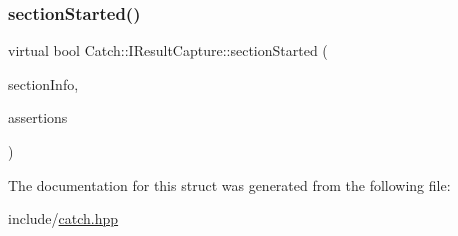 \mbox{\label{structCatch_1_1IResultCapture_a5b76ed52badcb64cf374202e12b81a03}} 
\subsubsection{\texorpdfstring{section\+Started()}{sectionStarted()}}
{\footnotesize\ttfamily virtual bool Catch\+::\+I\+Result\+Capture\+::section\+Started (\begin{DoxyParamCaption}\item[{\mbox{\hyperlink{structCatch_1_1SectionInfo}{Section\+Info}} const \&}]{section\+Info,  }\item[{\mbox{\hyperlink{structCatch_1_1Counts}{Counts}} \&}]{assertions }\end{DoxyParamCaption})\hspace{0.3cm}{\ttfamily [pure virtual]}}



The documentation for this struct was generated from the following file\+:\begin{DoxyCompactItemize}
\item 
include/\mbox{\hyperlink{catch_8hpp}{catch.\+hpp}}\end{DoxyCompactItemize}
